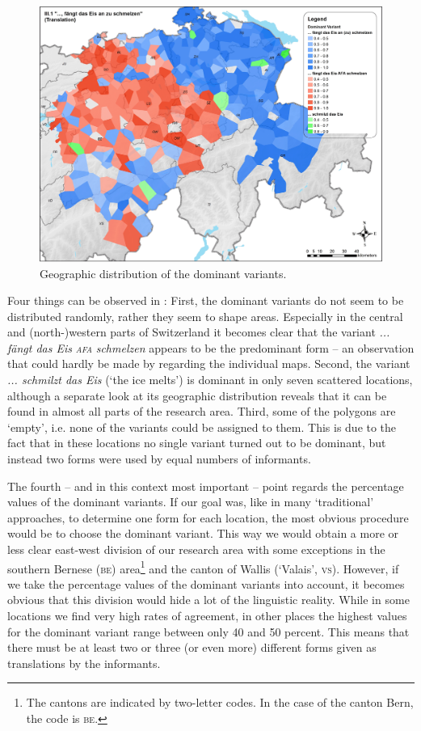 \documentclass[output=paper]{LSP/langsci}
\begin{document}
\begin{figure}
\includegraphics[width=\textwidth]{illustrations/stoeck_fig3}
\caption{Geographic distribution of the dominant variants.}
\label{fig:stoeck:3}
\end{figure}

Four things can be observed in : First, the dominant variants do not seem to be distributed randomly, rather they seem to shape areas. Especially in the central and (north-)western parts of Switzerland it becomes clear that the variant \emph{... fängt das Eis }\emph{\textsc{afa}}\emph{ schmelzen} appears to be the predominant form – an observation that could hardly be made by regarding the individual maps. Second, the variant \emph{... schmilzt das Eis} (‘the ice melts’) is dominant in only seven scattered locations, although a separate look at its geographic distribution reveals that it can be found in almost all parts of the research area. Third, some of the polygons are ‘empty’, i.e. none of the variants could be assigned to them. This is due to the fact that in these locations no single variant turned out to be dominant, but instead two forms were used by equal numbers of informants.

The fourth –  and in this context most important –  point regards the percentage values of the dominant variants. If our goal was, like in many ‘traditional’ approaches, to determine one form for each location, the most obvious procedure would be to choose the dominant variant. This way we would obtain a more or less clear east-west division of our research area with some exceptions in the southern Bernese (\textsc{be}) area\footnote{The cantons are indicated by two-letter codes. In the case of the canton Bern, the code is \textsc{be}.} and the canton of Wallis (‘Valais’, \textsc{vs}). However, if we take the percentage values of the dominant variants into account, it becomes obvious that this division would hide a lot of the linguistic reality. While in some locations we find very high rates of agreement, in other places the highest values for the dominant variant range between only 40 and 50 percent. This means that there must be at least two or three (or even more) different forms given as translations by the informants.
\end{document}
